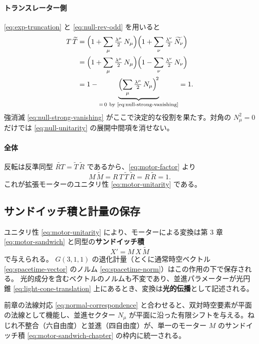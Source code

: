 \documentclass[dvipdfmx,a4paper,oneside]{jsbook}
\numberwithin{equation}{chapter}
\begin{document}
\paragraph{トランスレーター側}
\eqref{eq:exp-truncation} と \eqref{eq:null-rev-odd} を用いると
\begin{align}
  T\,\widetilde{T}
  &= \Bigl(1 + \sum_\mu \tfrac{\lambda^\mu}{2}\, N_\mu\Bigr)
     \Bigl(1 + \sum_\nu \tfrac{\lambda^\nu}{2}\,\widetilde{N_\nu}\Bigr) \notag\\
  &= \Bigl(1 + \sum_\mu \tfrac{\lambda^\mu}{2}\, N_\mu\Bigr)
     \Bigl(1 - \sum_\nu \tfrac{\lambda^\nu}{2}\, N_\nu\Bigr) \notag\\
  &= 1 - \underbrace{\Bigl(\sum_\mu \tfrac{\lambda^\mu}{2}\, N_\mu\Bigr)^{\!2}}_{=\,0\ \text{by \eqref{eq:null-strong-vanishing}}}
  = 1.
  \label{eq:null-unitarity}
\end{align}
強消滅 \eqref{eq:null-strong-vanishing} がここで決定的な役割を果たす。対角の \(N_\mu^2 = 0\) だけでは \eqref{eq:null-unitarity} の展開中間項を消せない。

\paragraph{全体}
反転は反準同型 \(\widetilde{RT} = \widetilde{T}\,\widetilde{R}\) であるから、\eqref{eq:motor-factor} より
\begin{equation}
  M\,\widetilde{M}
  = R\,T\,\widetilde{T}\,\widetilde{R}
  = R\,\widetilde{R}
  = 1.
\end{equation}
これが拡張モーターのユニタリ性 \eqref{eq:motor-unitarity} である。

\subsection{サンドイッチ積と計量の保存}

ユニタリ性 \eqref{eq:motor-unitarity} により、モーターによる変換は第 3 章 \eqref{eq:motor-sandwich} と同型の\textbf{サンドイッチ積}
\begin{equation}
  X' = M\,X\,\widetilde{M}
  \label{eq:motor-sandwich-chapter}
\end{equation}
で与えられる。
\(G(3,1,1)\) の退化計量（とくに通常時空ベクトル \eqref{eq:spacetime-vector} のノルム \eqref{eq:spacetime-norm}）はこの作用の下で保存される。
光的成分を含むベクトルのノルムも不変であり、並進パラメーターが光円錐 \eqref{eq:light-cone-translation} 上にあるとき、変換は\textbf{光的伝播}として記述される。

前章の法線対応 \eqref{eq:normal-correspondence} と合わせると、双対時空要素が平面の法線として機能し、並進セクター \(N_\mu\) が平面に沿った有限シフトを与える。ねじれ不整合（六自由度）と並進（四自由度）が、単一のモーター \(M\) のサンドイッチ積 \eqref{eq:motor-sandwich-chapter} の枠内に統一される。
\end{document}
